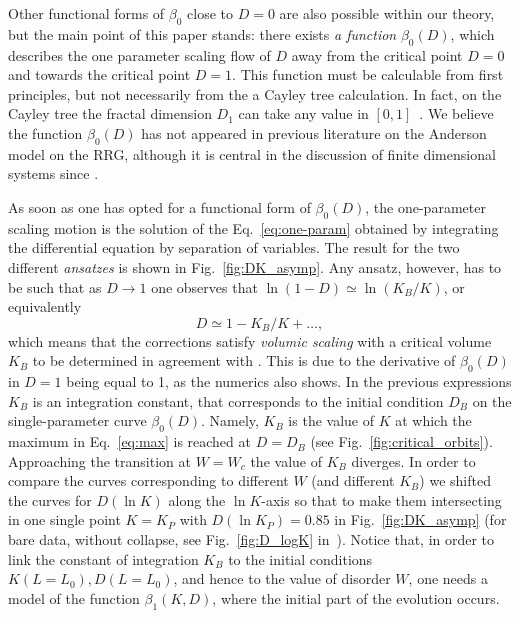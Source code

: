 \documentclass[reprint,aps,prl,superscriptaddress,english,nolongbibliography]{revtex4-2}
\begin{document}
{Other functional forms of $\beta_0$ close to $D=0$ are also possible within our theory, but the main point of this paper stands: there exists {\it a function} $\beta_0(D)$, which describes the one parameter scaling flow of $D$ away from the critical point $D=0$ and towards the critical point $D=1$. This function must be calculable from first principles, but not necessarily from the a Cayley tree calculation. In fact, on the Cayley tree the fractal dimension $D_1$ can take any value in $[0,1]$~\cite{monthus2011anderson,tikhonov2016fractality}. We believe the function $\beta_0(D)$ has not appeared in previous literature on the Anderson model on the RRG, although it is central in the discussion of finite dimensional systems since \cite{abrahams1979scaling}.
 
As soon as one has opted for a functional form of $\beta_0(D)$, the one-parameter scaling motion is the solution of the Eq.~\eqref{eq:one-param} obtained by integrating the differential equation by separation of variables. The result for the two different {\it ansatzes} is shown in Fig.~\ref{fig:DK_asymp}. 
Any ansatz, however, has to be such that as $D\to 1$ one observes that $\ln(1-D)\simeq\ln(K_B/K)$, or equivalently 
\begin{equation}
\label{eq:D_K0}
    D\simeq 1- K_B/K +\dots, 
\end{equation}    
which means that the corrections satisfy {\it volumic scaling} with a critical volume $K_B$ to be determined in agreement with \cite{zirnbauer1986localization,mirlin1991localization}. This is due to the derivative of $\beta_0(D)$ in $D=1$ being equal to 1, as the numerics also shows. 
In the previous expressions $K_B$ is an integration constant, that corresponds to the initial condition $D_B$ on the single-parameter curve $\beta_0(D)$. Namely, $K_B$ is the value of $K$ at which the maximum in Eq.~\eqref{eq:max} is reached at $D=D_B$ (see Fig.~\ref{fig:critical_orbits}). Approaching the transition at $W=W_c$ the value of $K_B$ diverges. In order to compare the curves corresponding to different $W$ (and different $K_B$) we shifted the curves for $D(\ln K)$ along the $\ln K$-axis so that to make them intersecting in one single point $K=K_{P}$ with $D(\ln K_{P})=0.85$ in Fig.~\ref{fig:DK_asymp} (for bare data, without collapse, see Fig.~\ref{fig:D_logK} in~\cite{SupplMat}).
Notice that, in order to link the constant of integration $K_B$ to the initial conditions $K(L=L_0),D(L=L_0)$, and hence to the value of disorder $W$, one needs a model of the function $\beta_1(K,D)$, where the initial part of the evolution occurs.

}
\end{document}
